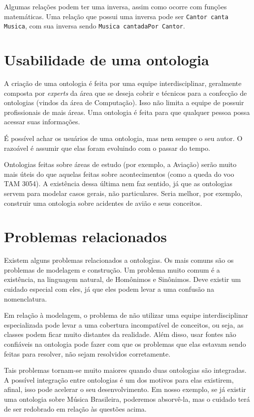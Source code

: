 Algumas relações podem ter uma inversa, assim como ocorre com funções matemáticas. Uma relação que possui uma inversa pode ser \texttt{Cantor canta Musica}, com sua inversa sendo \texttt{Musica cantadaPor Cantor}.

\section{Usabilidade de uma ontologia}

A criação de uma ontologia é feita por uma equipe interdisciplinar, geralmente composta por \textit{experts} da área que se deseja cobrir e técnicos para a confecção de ontologias (vindos da área de Computação). Isso não limita a equipe de possuir profissionais de mais áreas. Uma ontologia é feita para que qualquer pessoa possa acessar suas informações.

É possível achar os usuários de uma ontologia, mas nem sempre o seu autor. O razoável é assumir que elas foram evoluindo com o passar do tempo. 

Ontologias feitas sobre áreas de estudo (por exemplo, a Aviação) serão muito mais úteis do que aquelas feitas sobre acontecimentos (como a queda do voo TAM 3054). A existência dessa última nem faz sentido, já que as ontologias servem para modelar casos gerais, não particulares. Seria melhor, por exemplo, construir uma ontologia sobre acidentes de avião e seus conceitos.

\section{Problemas relacionados}

Existem alguns problemas relacionados a ontologias. Os mais comuns são os problemas de modelagem e construção. Um problema muito comum é a existência, na linguagem natural, de Homônimos e Sinônimos. Deve existir um cuidado especial com eles, já que eles podem levar a uma confusão na nomenclatura.

Em relação à modelagem, o problema de não utilizar uma equipe interdisciplinar especializada pode levar a uma cobertura incompatível de conceitos, ou seja, as classes podem ficar muito distantes da realidade. Além disso, usar fontes não confiáveis na ontologia pode fazer com que os problemas que elas estavam sendo feitas para resolver, não sejam resolvidos corretamente.

Tais problemas tornam-se muito maiores quando duas ontologias são integradas. A possível integração entre ontologias é um dos motivos para elas existirem, afinal, isso pode acelerar o seu desenvolvimento. Em nosso exemplo, se já existir uma ontologia sobre Música Brasileira, poderemos absorvê-la, mas o cuidado terá de ser redobrado em relação às questões acima. 

